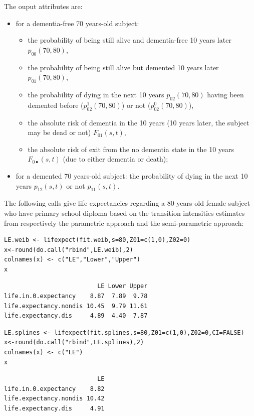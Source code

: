 \documentclass{article}
\begin{document}
The ouput attributes are:
\begin{itemize}
\item for a dementia-free 70 years-old subject: 
\begin{itemize}
\item the probability of being still alive and dementia-free 10 years later $p_{00}(70,80)$,
\item the probability of being still alive but demented 10 years later $p_{01}(70,80)$,
\item the probability of dying in the next 10 years $p_{02}(70,80)$ having been demented before ($p_{02}^1(70,80)$) or not ($p_{02}^0(70,80)$),
\item the absolute risk of dementia in the 10 years (10 years later, the subject may be dead or not) $F_{01}(s,t)$,
\item the absolute risk of exit from the no dementia state in the 10 years $F_{0 \scriptscriptstyle{\bullet}}(s,t)$ (due to either dementia or death);
\end{itemize}
\item for a demented 70 years-old subject: the probability of dying in the next 10 years $p_{12}(s,t)$ or not $p_{11}(s,t)$.
\end{itemize}

The following calls give life expectancies regarding 
a 80 years-old female subject who have primary school diploma based on the 
transition intensities estimates from respectively the parametric approach 
and the semi-parametric approach:
\lstset{basicstyle=\small\tt,numbers=left,language=R}
\begin{lstlisting}
LE.weib <- lifexpect(fit.weib,s=80,Z01=c(1,0),Z02=0)
x<-round(do.call("rbind",LE.weib),2)
colnames(x) <- c("LE","Lower","Upper")
x
\end{lstlisting}

\begin{verbatim}
                          LE Lower Upper
life.in.0.expectancy    8.87  7.89  9.78
life.expectancy.nondis 10.45  9.79 11.61
life.expectancy.dis     4.89  4.40  7.87
\end{verbatim}

\lstset{basicstyle=\small\tt,numbers=left,language=R}
\begin{lstlisting}
LE.splines <- lifexpect(fit.splines,s=80,Z01=c(1,0),Z02=0,CI=FALSE)
x<-round(do.call("rbind",LE.splines),2)
colnames(x) <- c("LE")
x
\end{lstlisting}

\begin{verbatim}
                          LE
life.in.0.expectancy    8.82
life.expectancy.nondis 10.42
life.expectancy.dis     4.91
\end{verbatim}
\end{document}
